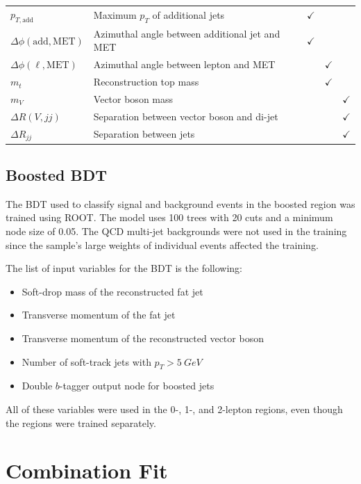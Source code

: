 \begin{table}
\begin{tabularx}{\textwidth}{|l|X|c|c|c|}
    $p_{T,\mathrm{add}}$ & Maximum $p_T$ of additional jets & $\checkmark$ & & \\
    $\Delta\phi(\mathrm{add, MET})$ & Azimuthal angle between additional jet and MET & $\checkmark$ & & \\
    \hline
    $\Delta\phi(\ell, \mathrm{MET})$ & Azimuthal angle between lepton and MET & & $\checkmark$ & \\
    $m_t$ & Reconstruction top mass & & $\checkmark$ & \\
    $m_V$ & Vector boson mass & & & $\checkmark$ \\
    \hline
    $\Delta R(V, jj)$ & Separation between vector boson and di-jet & & & $\checkmark$ \\
    $\Delta R_{jj}$ & Separation between jets & & & $\checkmark$ \\
    \hline
  \end{tabularx}
  \label{tab:dnn-inputs}
\end{table}

\subsection{Boosted BDT}

The BDT used to classify signal and background events in the boosted region
was trained using ROOT.
The model uses 100 trees with 20 cuts and a minimum node size of 0.05.
The QCD multi-jet backgrounds were not used in the training since the sample's large weights
of individual events affected the training.

The list of input variables for the BDT is the following:
\begin{itemize}
\item Soft-drop mass of the reconstructed fat jet
\item Transverse momentum of the fat jet
\item Transverse momentum of the reconstructed vector boson
\item Number of soft-track jets with $p_T > \SI{5}{GeV}$
\item Double $b$-tagger output node for boosted jets
\end{itemize}
All of these variables were used in the 0-, 1-, and 2-lepton regions,
even though the regions were trained separately.

\section{Combination Fit}

